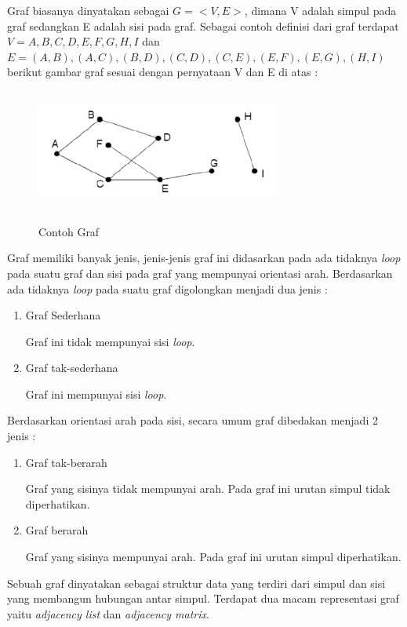 Graf biasanya dinyatakan sebagai $G = <V,E>$, dimana V adalah simpul pada graf sedangkan E adalah sisi pada graf. Sebagai contoh definisi dari graf terdapat $V = {A,B,C,D,E,F,G,H,I}$ dan $E = {(A,B),(A,C),(B,D),(C,D),(C,E),(E,F),(E,G),(H,I)}$ berikut gambar graf sesuai dengan pernyataan V dan E di atas :

	\begin{figure} [H]
		\centering  
		\caption[Contoh Graf]{Contoh Graf}
		\includegraphics[width=8cm, height=4cm]{graf5} 
		\label{fig:graf5} 
	\end{figure}
	
Graf memiliki banyak jenis, jenis-jenis graf ini didasarkan pada ada tidaknya \textit{loop} pada suatu graf dan sisi pada graf yang mempunyai orientasi arah. Berdasarkan ada tidaknya \textit{loop} pada suatu graf digolongkan menjadi dua jenis :
\begin{enumerate}
	\item Graf Sederhana
	
	Graf ini tidak mempunyai sisi \textit{loop}.
	\item Graf tak-sederhana
	
	Graf ini mempunyai sisi \textit{loop}.
\end{enumerate}

Berdasarkan orientasi arah pada sisi, secara umum graf dibedakan menjadi 2 jenis :
\begin{enumerate}
	\item Graf tak-berarah
	
	Graf yang sisinya tidak mempunyai arah. Pada graf ini urutan simpul tidak diperhatikan.
	\item Graf berarah
	
	Graf yang sisinya mempunyai arah. Pada graf ini urutan simpul diperhatikan. \cite{referensiCA5}
\end{enumerate}

Sebuah graf dinyatakan sebagai struktur data yang terdiri dari simpul dan sisi yang membangun hubungan antar simpul. Terdapat dua macam representasi graf yaitu \textit{adjacency list} dan \textit{adjacency matrix}. \cite{referensiGraph1}

